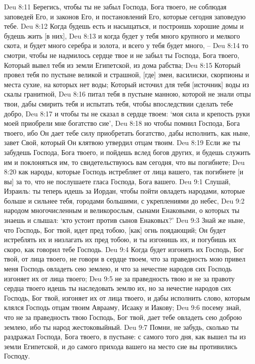 Deu 8:11  Берегись, чтобы ты не забыл Господа, Бога твоего, не соблюдая заповедей Его, и законов Его, и постановлений Его, которые сегодня заповедую тебе.
Deu 8:12  Когда будешь есть и насыщаться, и построишь хорошие домы и будешь жить [в них],
Deu 8:13  и когда будет у тебя много крупного и мелкого скота, и будет много серебра и золота, и всего у тебя будет много, --
Deu 8:14  то смотри, чтобы не надмилось сердце твое и не забыл ты Господа, Бога твоего, Который вывел тебя из земли Египетской, из дома рабства;
Deu 8:15  Который провел тебя по пустыне великой и страшной, [где] змеи, василиски, скорпионы и места сухие, на которых нет воды; Который источил для тебя [источник] воды из скалы гранитной,
Deu 8:16  питал тебя в пустыне манною, которой не знали отцы твои, дабы смирить тебя и испытать тебя, чтобы впоследствии сделать тебе добро,
Deu 8:17  и чтобы ты не сказал в сердце твоем: `моя сила и крепость руки моей приобрели мне богатство сие',
Deu 8:18  но чтобы помнил Господа, Бога твоего, ибо Он дает тебе силу приобретать богатство, дабы исполнить, как ныне, завет Свой, который Он клятвою утвердил отцам твоим.
Deu 8:19  Если же ты забудешь Господа, Бога твоего, и пойдешь вслед богов других, и будешь служить им и поклоняться им, то свидетельствуюсь вам сегодня, что вы погибнете;
Deu 8:20  как народы, которые Господь истребляет от лица вашего, так погибнете [и вы] за то, что не послушаете гласа Господа, Бога вашего.
Deu 9:1  Слушай, Израиль: ты теперь идешь за Иордан, чтобы пойти овладеть народами, которые больше и сильнее тебя, городами большими, с укреплениями до небес,
Deu 9:2  народом многочисленным и великорослым, сынами Енаковыми, о которых ты знаешь и слышал: `кто устоит против сынов Енаковых?'
Deu 9:3  Знай же ныне, что Господь, Бог твой, идет пред тобою, [как] огнь поядающий; Он будет истреблять их и низлагать их пред тобою, и ты изгонишь их, и погубишь их скоро, как говорил тебе Господь.
Deu 9:4  Когда будет изгонять их Господь, Бог твой, от лица твоего, не говори в сердце твоем, что за праведность мою привел меня Господь овладеть сею землею, и что за нечестие народов сих Господь изгоняет их от лица твоего;
Deu 9:5  не за праведность твою и не за правоту сердца твоего идешь ты наследовать землю их, но за нечестие народов сих Господь, Бог твой, изгоняет их от лица твоего, и дабы исполнить слово, которым клялся Господь отцам твоим Аврааму, Исааку и Иакову;
Deu 9:6  посему знай, что не за праведность твою Господь, Бог твой, дает тебе овладеть сею доброю землею, ибо ты народ жестоковыйный.
Deu 9:7  Помни, не забудь, сколько ты раздражал Господа, Бога твоего, в пустыне: с самого того дня, как вышел ты из земли Египетской, и до самого прихода вашего на место сие вы противились Господу.
